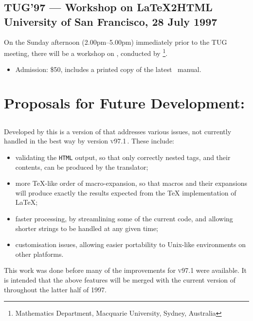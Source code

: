 \vfil

\subsection*[center]{TUG'97 --- Workshop on \LaTeX2HTML\\
University of San Francisco, 28 July 1997\label{tug97}}

\noindent
On the Sunday afternoon (2.00pm--5.00pm)
immediately prior to the TUG meeting, there will be a workshop
on \latextohtml, conducted by \RossMoore\footnote{%
Mathematics Department, Macquarie University, Sydney, Australia}.

\begin{itemize}
\item[]
Admission: \$50, includes a printed copy of the latest \latextohtml\ manual.

\end{itemize}

\vfil


\clearpage
\section*{Proposals for Future Development:\label{future}}%


\subsection*{\latextohtmlNG}
Developed by \Hennecke\label{latex2htmlNG} this is a version of
\latextohtml{} that addresses various issues,
not currently handled in the best way by version \textsc{v97.1}\,.
These include:
\begin{itemize}
\item validating the \texttt{HTML} output,
so that only correctly nested tags, and their contents,
can be produced by the translator;
%
\item more \TeX-like order of macro-expansion,
so that macros and their expansions will produce exactly
the results expected from the \TeX{} implementation of \LaTeX;
%
\item faster processing,
by streamlining some of the current \Perl{} code, and allowing
shorter strings to be handled at any given time;
%
\item customisation issues,
allowing easier portability to Unix-like environments on
other platforms.
%
\end{itemize}
This work was done before many of the improvements for \textsc{v97.1}
were available. It is intended that the above features will
be merged with the current version of \latextohtml{} throughout
the latter half of 1997.

